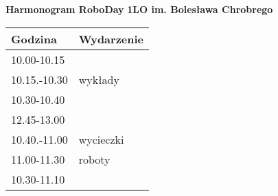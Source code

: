 \documentclass{article}
\begin{document}
\begin{center}
\Large\textbf{Harmonogram RoboDay}
\large\textbf{1LO im. Bolesława Chrobrego}
\end{center}
\vspace{1cm}
\begin{center}
\begin{tabular}{|l|l|}
\hline
\textbf{Godzina} & \textbf{Wydarzenie} \\
\hline
10.00-10.15 &  \\
\hline
10.15.-10.30 & wykłady \\
\hline
10.30-10.40 &  \\
\hline
12.45-13.00 &  \\
\hline
10.40.-11.00 & wycieczki \\
\hline
11.00-11.30 & roboty \\
\hline
10.30-11.10 &  \\
\hline
\end{tabular}
\end{center}
\end{document}
